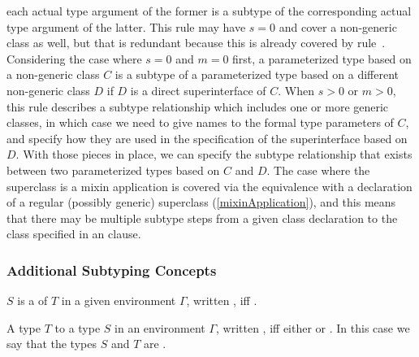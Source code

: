 \documentclass[makeidx]{article}
\begin{document}
{{\begin{itemize}
  each actual type argument of the former is a subtype of
  the corresponding actual type argument of the latter.
  This rule may have $s = 0$ and cover a non-generic class as well,
  but that is redundant because this is already covered by
  rule~\SrnReflexivity{}.
  Considering the case where $s = 0$ and $m = 0$ first,
  a parameterized type based on a non-generic class $C$ is a subtype of
  a parameterized type based on a different non-generic class $D$ if
  $D$ is a direct superinterface of $C$.
  When $s > 0$ or $m > 0$, this rule describes a subtype relationship
  which includes one or more generic classes,
  in which case we need to give names to the formal type parameters of $C$,
  and specify how they are used in the specification of the superinterface
  based on $D$.
  With those pieces in place, we can specify the subtype relationship
  that exists between two parameterized types based on $C$ and $D$.
  The case where the superclass is a mixin application is covered via
  the equivalence with a declaration of a regular (possibly generic) superclass
  (\ref{mixinApplication}),
  and this means that there may be multiple subtype steps from
  a given class declaration to the class specified in an \EXTENDS{} clause.
\end{itemize}
}


\subsubsection{Additional Subtyping Concepts}

\LMHash{}%
$S$ is a  of $T$ in a given environment $\Gamma$,
written ,
if{}f .

\LMHash{}%
A type $T$
to a type $S$ in an environment $\Gamma$,
written ,
if{}f either  or .
In this case we say that the types $S$ and $T$ are
.

}
\end{document}
